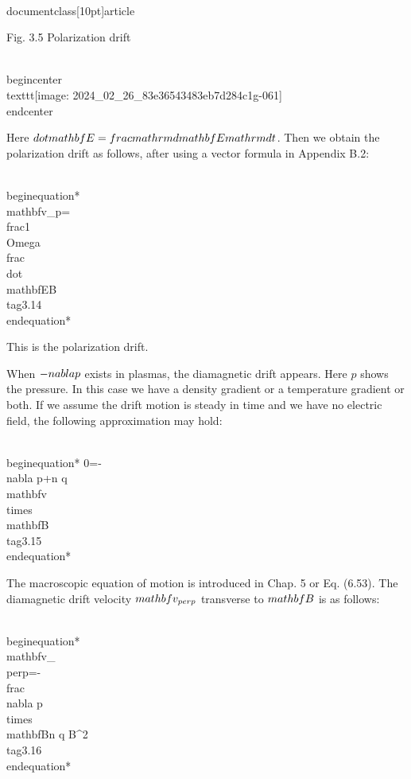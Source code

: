 \\documentclass[10pt]{article}
\begin{document}
Fig. 3.5 Polarization drift

\\begin{center}
\\texttt{[image: 2024\_02\_26\_83e36543483eb7d284c1g-061]}
\\end{center}

Here $\\dot{\\mathbf{E}}=\\frac{\\mathrm{d} \\mathbf{E}}{\\mathrm{d} t}$. Then we obtain the polarization drift as follows, after using a vector formula in Appendix B.2:


\\begin{equation*}
\\mathbf{v}_{p}=\\frac{1}{\\Omega} \\frac{\\dot{\\mathbf{E}}}{B} \\tag{3.14}
\\end{equation*}


This is the polarization drift.

When $-\\nabla p$ exists in plasmas, the diamagnetic drift appears. Here $p$ shows the pressure. In this case we have a density gradient or a temperature gradient or both. If we assume the drift motion is steady in time and we have no electric field, the following approximation may hold:


\\begin{equation*}
0=-\\nabla p+n q \\mathbf{v} \\times \\mathbf{B} \\tag{3.15}
\\end{equation*}


The macroscopic equation of motion is introduced in Chap. 5 or Eq. (6.53). The diamagnetic drift velocity $\\mathbf{v}_{\\perp}$ transverse to $\\mathbf{B}$ is as follows:


\\begin{equation*}
\\mathbf{v}_{\\perp}=-\\frac{\\nabla p \\times \\mathbf{B}}{n q B^{2}} \\tag{3.16}
\\end{equation*}
\end{document}
